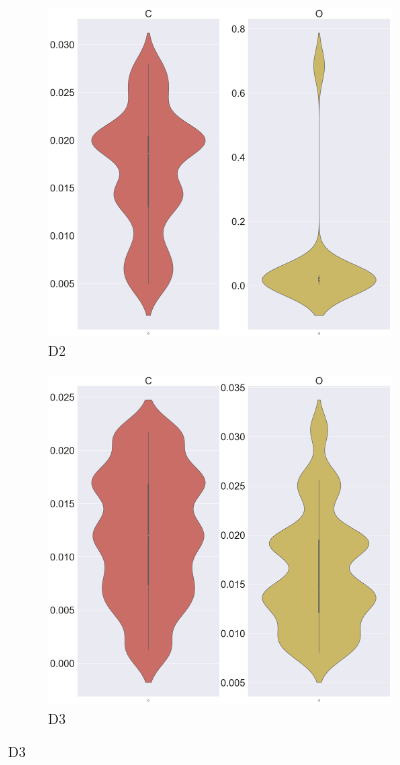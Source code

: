 \begin{figure}
\centering

\begin{subfigure}{0.45\textwidth}
\centering
\includegraphics[width=\textwidth]{Figures/Analysis/IVDW/D2_AtomicShift_2.png}
\caption{D2}
\label{fig:StructAnal2_D2}
\end{subfigure}
\begin{subfigure}{0.45\textwidth}
\centering
\includegraphics[width=\textwidth]{Figures/Analysis/IVDW/D3_AtomicShift_2.png}
\caption{D3}
\label{fig:StructAnal2_D3}
\end{subfigure}


\end{figure}
